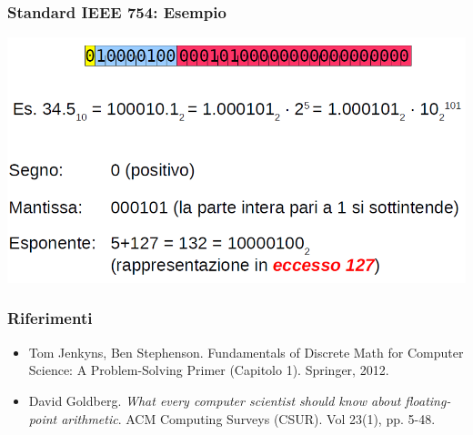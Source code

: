 \documentclass[xcolor={table}]{beamer}
\begin{document}
\begin{frame}
   \frametitle{Standard IEEE 754: Esempio}

   \begin{center}
   \includegraphics[width=\textwidth]{img/binary12.PNG}
   \end{center}
\end{frame}


\begin{frame}
   \frametitle{Riferimenti}

   \begin{itemize}
   \item Tom Jenkyns, Ben Stephenson. Fundamentals of Discrete Math for Computer Science: A Problem-Solving Primer (Capitolo 1). Springer, 2012.
   
   \bigskip
   \item David Goldberg. {\it What every computer scientist should know about floating-point arithmetic}. 
   ACM Computing Surveys (CSUR). Vol 23(1), pp. 5-48.
   \end{itemize}
\end{frame}
\end{document}
